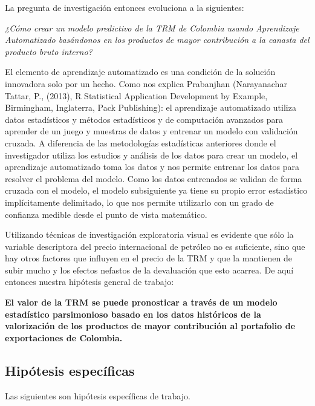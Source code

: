 La pregunta de investigación entonces evoluciona a la siguientes:

\textit{¿Cómo crear un modelo predictivo de la TRM de Colombia usando Aprendizaje Automatizado basándonos en los productos de mayor contribución a la canasta del producto bruto interno?}

El elemento de aprendizaje automatizado es una condición de la solución innovadora solo por un hecho. Como nos explica Prabanjhan (Narayanachar Tattar, P., (2013), R Statistical Application Development by Example, Birmingham, Inglaterra, Pack Publishing): el aprendizaje automatizado utiliza datos estadísticos y métodos estadísticos y de computación avanzados para aprender de un juego y muestras de datos y entrenar un modelo con validación cruzada. A diferencia de las metodologías estadísticas anteriores donde el investigador utiliza los estudios y análisis de los datos para crear un modelo, el aprendizaje automatizado toma los datos y nos permite entrenar los datos para resolver el problema del modelo. Como los datos entrenados se validan de forma cruzada con el modelo, el modelo subsiguiente ya tiene su propio error estadístico implícitamente delimitado, lo que nos permite utilizarlo con un grado de confianza medible desde el punto de vista matemático. 

Utilizando técnicas de investigación exploratoria visual es evidente que sólo la variable descriptora del precio internacional de petróleo no es suficiente, sino que hay otros factores que influyen en el precio de la TRM y que la mantienen de subir mucho y los efectos nefastos de la devaluación que esto acarrea. De aquí entonces nuestra hipótesis general de trabajo:

\textbf{El valor de la TRM se puede pronosticar a través de un modelo estadístico parsimonioso basado en los datos históricos de la valorización de los productos de mayor contribución al portafolio de exportaciones de Colombia.}

\subsection{Hipótesis específicas} 
Las siguientes son hipótesis específicas de trabajo.

